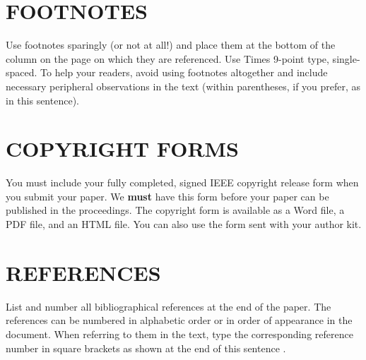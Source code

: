 \documentclass{article}
\begin{document}
\section{FOOTNOTES}
\label{sec:foot}

Use footnotes sparingly (or not at all!) and place them at the bottom of the
column on the page on which they are referenced. Use Times 9-point type,
single-spaced. To help your readers, avoid using footnotes altogether and
include necessary peripheral observations in the text (within parentheses, if
you prefer, as in this sentence).


\section{COPYRIGHT FORMS}
\label{sec:copyright}

You must include your fully completed, signed IEEE copyright release form when
you submit your paper. We {\bf must} have this form before your paper can be
published in the proceedings.  The copyright form is available as a Word file,
a PDF file, and an HTML file. You can also use the form sent with your author
kit.

\section{REFERENCES}
\label{sec:ref}

List and number all bibliographical references at the end of the paper.  The references can be numbered in alphabetic order or in order of appearance in the document.  When referring to them in the text, type the corresponding reference number in square brackets as shown at the end of this sentence \cite{C2}.



\end{document}
